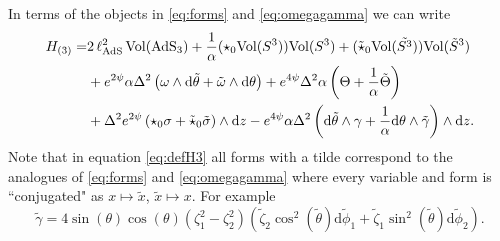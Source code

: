 \documentclass[a4paper, 11pt]{article}
\numberwithin{equation}{section}
\newcommand{\+}{\oplus}
\renewcommand{\d}{\ensuremath{\mathrm{d}}\xspace}
\begin{document}
In terms of the objects in \eqref{eq:forms} and \eqref{eq:omegagamma} we can write
\begin{equation}\label{eq:defH3}
	\begin{split}
		H_{(3)}=&2\,\ell_{\rm AdS}^{2}\,{\rm Vol}({\rm AdS_{3}})+\frac1 \alpha(\star_0 {\rm Vol}(S^3)){\rm Vol}(S^3)+(\tilde{\star}_0{\rm Vol}(\tilde{S^3})){\rm Vol}(\tilde{S}^3)\\
		&+e^{2\psi}\alpha\Delta^2\left(\omega\wedge\d \tilde\theta+\tilde\omega\wedge\d \theta\right)
		+e^{4\psi}\Delta^2\alpha \left(\Theta +\frac 1{\alpha}\tilde \Theta \right)\\
		&+\Delta^2e^{2\psi}\left(\star_0\sigma+\tilde{\star}_0\tilde\sigma \right)\wedge\d z
		-e^{4\psi}\alpha\Delta^2\left(\d\tilde \theta \wedge \gamma +\frac 1{\alpha}\d \theta\wedge\tilde\gamma\right)\wedge\d z.
	\end{split}
\end{equation}
Note that in equation \eqref{eq:defH3} all forms with a tilde correspond to the analogues of \eqref{eq:forms} and \eqref{eq:omegagamma} where every variable and form is ``conjugated" as $x\mapsto\tilde x$, $\tilde x\mapsto x$. For example 
\begin{equation}
	\tilde\gamma=4\sin(\theta)\cos(\theta)(\zeta_1^2-\zeta_2 ^2)\left(\tilde{\zeta}_2\cos^2(\tilde \theta)\d \tilde \phi _1+\tilde{\zeta} _1\sin^2(\tilde\theta)\d\tilde\phi _2\right).
\end{equation} 
\end{document}
